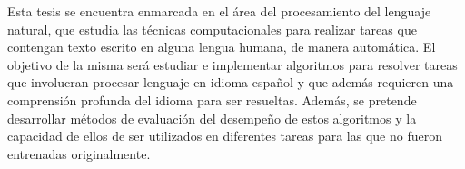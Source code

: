 Esta tesis se encuentra enmarcada en el área del procesamiento del lenguaje natural, que estudia las técnicas computacionales para realizar tareas que contengan texto escrito en alguna lengua humana, de manera automática. El objetivo de la misma será estudiar e implementar algoritmos para resolver tareas que involucran procesar lenguaje en idioma español y que además requieren una comprensión profunda del idioma para ser resueltas. Además, se pretende desarrollar métodos de evaluación del desempeño de estos algoritmos y la capacidad de ellos de ser utilizados en diferentes tareas para las que no fueron entrenadas originalmente.



